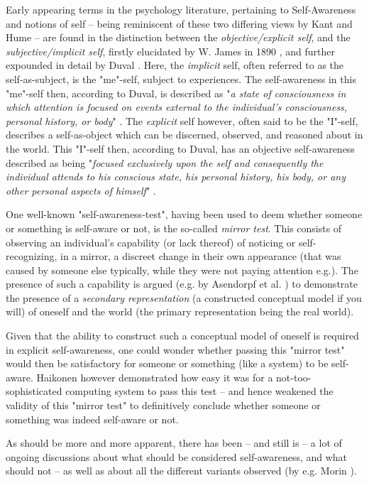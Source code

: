 	Early appearing terms in the psychology literature, pertaining to Self-Awareness and notions of self -- being reminiscent of these two differing views by Kant and Hume -- are found in the distinction between the \textit{objective/explicit self}, and the \textit{subjective/implicit self}, firstly elucidated by W. James in 1890 \cite{james_explicit_implicit_self}, and further expounded in detail by Duval \cite{duval111}. Here, the \textit{implicit} self, often referred to as the self-as-subject, is the "me"-self, subject to experiences. The self-awareness in this "me"-self then, according to Duval, is described as "\textit{a state of consciousness in which attention is focused on events external to the individual's consciousness, personal history, or body}" \cite{duval111}. The \textit{explicit} self however, often said to be the "I"-self, describes a self-as-object which can be discerned, observed, and reasoned about in the world. This "I"-self then, according to Duval, has an objective self-awareness described as being "\textit{focused exclusively upon the self and consequently the individual attends to his conscious state, his personal history, his body, or any other personal aspects of himself}" \cite{duval111}.

	One well-known "self-awareness-test", having been used to deem whether someone or something is self-aware or not, is the so-called \textit{mirror test}. This consists of observing an individual's capability (or lack thereof) of noticing or self-recognizing, in a mirror, a discreet change in their own appearance (that was caused by someone else typically, while they were not paying attention e.g.). The presence of such a capability is argued (e.g. by Asendorpf et al. \cite{asendorpf}) to demonstrate the presence of a \textit{secondary representation} (a constructed conceptual model if you will) of oneself and the world (the primary representation being the real world). 

	Given that the ability to construct such a conceptual model of oneself is required in explicit self-awareness, one could wonder whether passing this "mirror test" would then be satisfactory for someone or something (like a system) to be self-aware. Haikonen \cite{haikonen} however demonstrated how easy it was for a not-too-sophisticated computing system to pass this test -- and hence weakened the validity of this "mirror test" to definitively conclude whether someone or something was indeed self-aware or not.

	As should be more and more apparent, there has been -- and still is -- a lot of ongoing discussions about what should be considered self-awareness, and what should not -- as well as about all the different variants observed (by e.g. Morin \cite{morin}).


